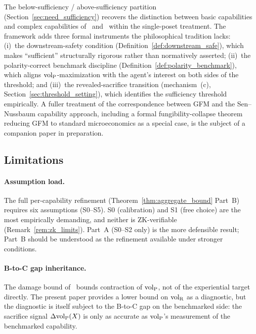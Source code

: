 The below-sufficiency / above-sufficiency partition
(Section~\ref{sec:need_sufficiency}) recovers the distinction
between basic capabilities and complex capabilities
of~\citet{sen1999development} and~\citet{nussbaum2011creating}
within the single-poset treatment.  The framework adds three
formal instruments the philosophical tradition lacks: (i)~the
downstream-safety condition (Definition~\ref{def:downstream_safe}),
which makes ``sufficient'' structurally rigorous rather than
normatively asserted; (ii)~the polarity-correct benchmark
discipline (Definition~\ref{def:polarity_benchmark}), which
aligns ${\operatorname{vol}_{\mathrm{P}}}$-maximization with the agent's interest on both
sides of the threshold; and (iii)~the revealed-sacrifice
transition (mechanism~(c), Section~\ref{sec:threshold_setting}),
which identifies the sufficiency threshold empirically.
A fuller treatment of the correspondence between GFM and the
Sen--Nussbaum capability approach, including a formal
fungibility-collapse theorem reducing GFM to standard
microeconomics as a special case, is the subject of a companion
paper in preparation.

\subsection{Limitations}

\paragraph{Assumption load.}
The full per-capability refinement (Theorem~\ref{thm:aggregate_bound}
Part~B) requires six assumptions (S0--S5).  S0 (calibration) and
S1 (free choice) are the most empirically demanding, and neither
is ZK-verifiable (Remark~\ref{rem:zk_limits}).  Part~A (S0--S2
only) is the more defensible result; Part~B should be understood
as the refinement available under stronger conditions.

\paragraph{B-to-C gap inheritance.}
The damage bound of~\citep[Theorem~1]{lasser2026wamura} bounds
contraction of ${\operatorname{vol}_{\mathrm{P}}}$, not of the experiential target directly.
The present paper provides a lower bound on ${\operatorname{vol}_{\mathrm{R}}}$ as a
diagnostic, but the diagnostic is itself subject to the B-to-C gap
on the benchmarked side: the sacrifice signal $\Delta{\operatorname{vol}_{\mathrm{P}}}(X)$ is
only as accurate as ${\operatorname{vol}_{\mathrm{P}}}$'s measurement of the benchmarked
capability.


